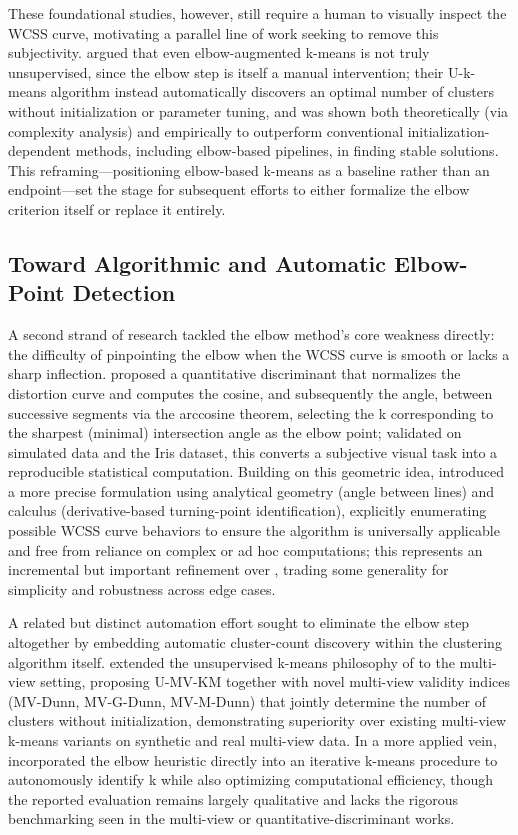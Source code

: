 These foundational studies, however, still require a human to visually inspect the WCSS curve, motivating a parallel line of work seeking to remove this subjectivity. \cite{sinaga2020unsupervised} argued that even elbow-augmented k-means is not truly unsupervised, since the elbow step is itself a manual intervention; their U-k-means algorithm instead automatically discovers an optimal number of clusters without initialization or parameter tuning, and was shown both theoretically (via complexity analysis) and empirically to outperform conventional initialization-dependent methods, including elbow-based pipelines, in finding stable solutions. This reframing---positioning elbow-based k-means as a baseline rather than an endpoint---set the stage for subsequent efforts to either formalize the elbow criterion itself or replace it entirely.

\subsection{Toward Algorithmic and Automatic Elbow-Point Detection}
A second strand of research tackled the elbow method's core weakness directly: the difficulty of pinpointing the elbow when the WCSS curve is smooth or lacks a sharp inflection. \cite{shi2021quantitative} proposed a quantitative discriminant that normalizes the distortion curve and computes the cosine, and subsequently the angle, between successive segments via the arccosine theorem, selecting the k corresponding to the sharpest (minimal) intersection angle as the elbow point; validated on simulated data and the Iris dataset, this converts a subjective visual task into a reproducible statistical computation. Building on this geometric idea, \cite{herdiana2026more} introduced a more precise formulation using analytical geometry (angle between lines) and calculus (derivative-based turning-point identification), explicitly enumerating possible WCSS curve behaviors to ensure the algorithm is universally applicable and free from reliance on complex or ad hoc computations; this represents an incremental but important refinement over \cite{shi2021quantitative}, trading some generality for simplicity and robustness across edge cases.

A related but distinct automation effort sought to eliminate the elbow step altogether by embedding automatic cluster-count discovery within the clustering algorithm itself. \cite{yang2023unsupervised} extended the unsupervised k-means philosophy of \cite{sinaga2020unsupervised} to the multi-view setting, proposing U-MV-KM together with novel multi-view validity indices (MV-Dunn, MV-G-Dunn, MV-M-Dunn) that jointly determine the number of clusters without initialization, demonstrating superiority over existing multi-view k-means variants on synthetic and real multi-view data. In a more applied vein, \cite{gowsic2024enhanced} incorporated the elbow heuristic directly into an iterative k-means procedure to autonomously identify k while also optimizing computational efficiency, though the reported evaluation remains largely qualitative and lacks the rigorous benchmarking seen in the multi-view or quantitative-discriminant works.

